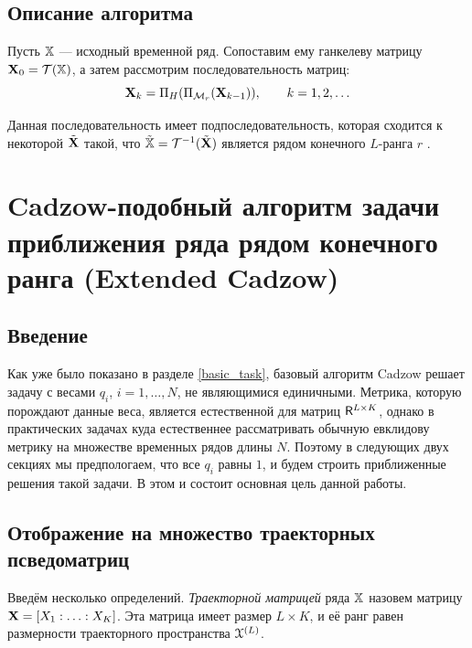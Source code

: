 \documentclass[12pt,a4paper,fleqn,leqno]{article}
\begin{document}
\subsection{Описание алгоритма}
Пусть $\mathbb{X}$ --- исходный временной ряд. Сопоставим ему ганкелеву матрицу $\mathbf{X}_0 = \mathcal{T}(\mathbb{X})$, а затем рассмотрим последовательность матриц:
\begin{equation*}
\mathbf{X}_k = \Pi_H (\Pi_{\mathcal{M}_r} (\mathbf{X}_{k-1})), \qquad k = 1, 2, \ldots
\end{equation*}

Данная последовательность имеет подпоследовательность, которая сходится к некоторой $\tilde{\mathbf{X}}$ такой, что $\tilde{\mathbb{X}} = \mathcal{T}^{-1}(\tilde{\mathbf{X}})$ является рядом конечного $L$-ранга $r$ \cite{Cadzow1988}.

\section{Cadzow-подобный алгоритм задачи приближения ряда рядом конечного ранга (Extended Cadzow)}
\subsection{Введение}
Как уже было показано в разделе \ref{basic_task}, базовый алгоритм Cadzow решает задачу с весами $q_i$, $i = 1, \ldots, N$, не являющимися единичными. Метрика, которую порождают данные веса, является естественной для матриц $\mathsf{R}^{L \times K}$, однако в практических задачах куда естественнее рассматривать обычную евклидову метрику на множестве временных рядов длины $N$. Поэтому в следующих двух секциях мы предпологаем, что все $q_i$ равны $1$, и будем строить приближенные решения такой задачи. В этом и состоит основная цель данной работы.

\subsection{Отображение на множество траекторных псведоматриц}
Введём несколько определений. \emph{Траекторной матрицей} ряда $\mathbb{X}$ назовем матрицу $\mathbf{X} = [X_1 : \ldots : X_K]$. Эта матрица имеет размер $L \times K$, и её ранг равен размерности траекторного пространства $\EuScript{X}^{(L)}$.
\end{document}
